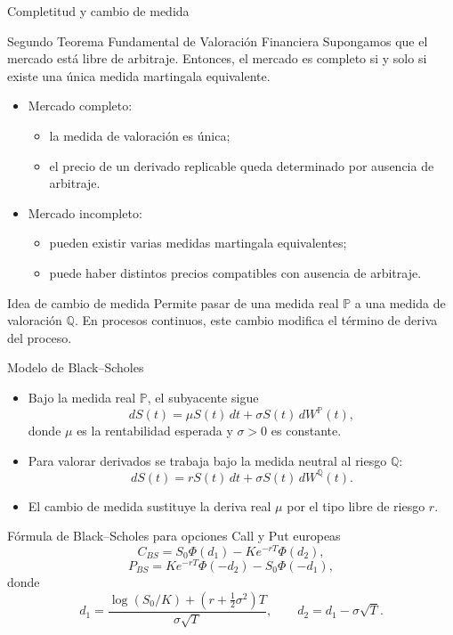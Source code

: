 \documentclass[8pt]{beamer}
\begin{document}

\begin{frame}{Completitud y cambio de medida}

\begin{block}{Segundo Teorema Fundamental de Valoración Financiera}
Supongamos que el mercado está libre de arbitraje. Entonces, el mercado es completo si y solo si existe una única medida martingala equivalente.
\end{block}
\pause
\begin{itemize}
    \item Mercado completo:
    \begin{itemize}
        \item la medida de valoración es única;
        \item el precio de un derivado replicable queda determinado por ausencia de arbitraje.
    \end{itemize}

    \item Mercado incompleto:
    \begin{itemize}
        \item pueden existir varias medidas martingala equivalentes;
        \item puede haber distintos precios compatibles con ausencia de arbitraje.
    \end{itemize}
\end{itemize}
\pause
\begin{block}{Idea de cambio de medida}
Permite pasar de una medida real $\mathbb P$ a una medida de valoración $\mathbb Q$.
En procesos continuos, este cambio modifica el término de deriva del proceso.
\end{block}
\end{frame}

\begin{frame}{Modelo de Black--Scholes}

\begin{itemize}
    \item Bajo la medida real $\mathbb P$, el subyacente sigue
    \[
        dS(t)=\mu S(t)\,dt+\sigma S(t)\,dW^{\mathbb P}(t),
    \]
    donde $\mu$ es la rentabilidad esperada y $\sigma>0$ es constante.
    \pause
    \item Para valorar derivados se trabaja bajo la medida neutral al riesgo $\mathbb Q$:
    \[
        dS(t)=rS(t)\,dt+\sigma S(t)\,dW^{\mathbb Q}(t).
    \]

    \item El cambio de medida sustituye la deriva real $\mu$ por el tipo libre de riesgo $r$.
\end{itemize}
\pause
\begin{block}{Fórmula de Black--Scholes para opciones Call y Put europeas}
\[
    C_{BS}=S_0\Phi(d_1)-Ke^{-rT}\Phi(d_2),
\]
\[
    P_{BS}=Ke^{-rT}\Phi(-d_2)-S_0\Phi(-d_1),
\]
donde
\[
    d_1=
    \frac{\log(S_0/K)+(r+\frac{1}{2}\sigma^2)T}{\sigma\sqrt{T}},
    \qquad
    d_2=d_1-\sigma\sqrt{T}.
\]
\end{block}

\end{frame}
\end{document}
